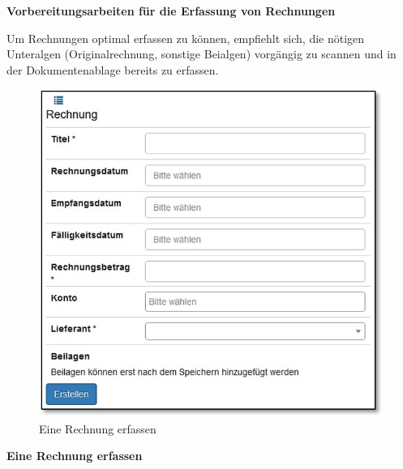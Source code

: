 \vspace{\baselineskip}

\textbf{Vorbereitungsarbeiten für die Erfassung von Rechnungen}

\vspace{\baselineskip}

Um Rechnungen optimal erfassen zu können, empfiehlt sich, die nötigen Unteralgen (Originalrechnung, sonstige Beialgen) vorgängig zu scannen und in der Dokumentenablage bereits zu erfassen.

\vspace{\baselineskip}

\begin{figure}   %
  \vspace{-35pt}      %
  \begin{center}
    \includegraphics[width=1\linewidth]{../chapters/07_Controlling/pictures/contr_RechnungErfassen.jpg}
  \end{center}
  \vspace{-20pt}
  \caption{Eine Rechnung erfassen}
  \vspace{-10pt}
\end{figure}
\textbf{Eine Rechnung erfassen}

\vspace{\baselineskip}

